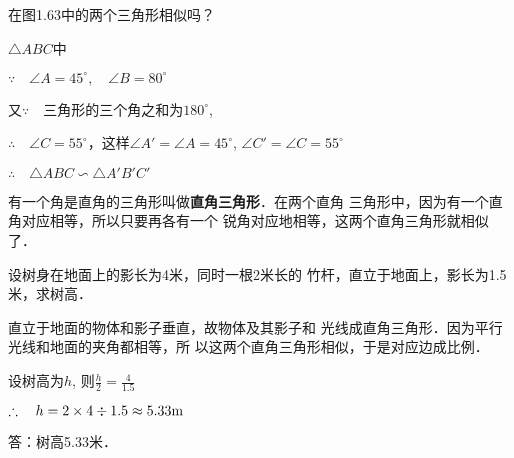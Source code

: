 \begin{example}
	在图1.63中的两个三角形相似吗？
\end{example}

\begin{figure}[htp]
	\centering
{}
	\caption{}
\end{figure}

\begin{solution}
	$\triangle ABC$中

$\because\quad \angle A=45^{\circ},\quad \angle B=80^{\circ}$

又$\because\quad $三角形的三个角之和为$180^{\circ}$, 

$\therefore\quad \angle C=55^{\circ}$，这样$\angle A'=\angle A=45^{\circ}$, $\angle C'=\angle C=55^{\circ}$

$\therefore\quad \triangle ABC\backsim \triangle A'B'C'$
\end{solution}

有一个角是直角的三角形叫做\textbf{直角三角形}．在两个直角
三角形中，因为有一个直角对应相等，所以只要再各有一个
锐角对应地相等，这两个直角三角形就相似了．

\begin{example}
	设树身在地面上的影长为4米，同时一根2米长的
竹杆，直立于地面上，影长为1.5米，求树高．
\end{example}

\begin{solution}
	直立于地面的物体和影子垂直，故物体及其影子和
光线成直角三角形．因为平行光线和地面的夹角都相等，所
以这两个直角三角形相似，于是对应边成比例．

设树高为$h$, 则$\frac{h}{2}=\frac{4}{1.5}$

$\therefore\quad h=2\times4\div 1.5\approx 5.33{\rm m}$

答：树高5.33米．
\end{solution}

